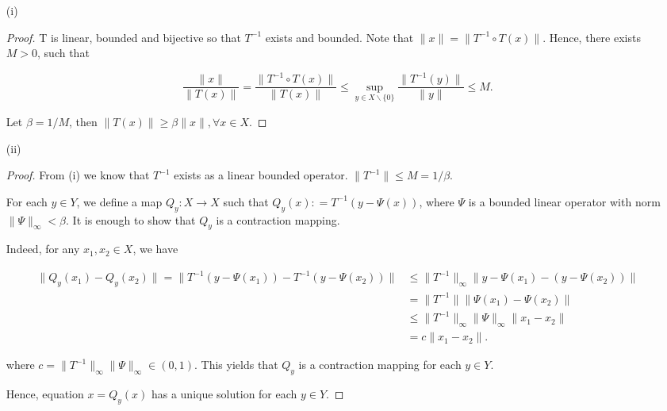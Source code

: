 \documentclass[12pt]{article}
\begin{document}
\begin{enumerate}

\item [(i)]

\begin{proof}

T is linear, bounded and bijective so that $T^{-1}$ exists and bounded. Note that $\|x\| = \|T^{-1}\circ T(x)\|$. Hence, there exists $M>0$, such that

$$
\frac{\| x \|}{\| T(x) \|} = \frac{\|T^{-1}\circ T(x)\|}{\| T(x) \|} \leqslant \sup_{y\in X\backslash \{ 0 \} } \frac{\| T^{-1} (y) \|}{\| y \|} \leqslant M.
$$

Let $\beta = 1/M$, then $\|T(x)\| \geqslant \beta \|x\|, \forall x \in X$.

\end{proof}

\item [(ii)]

\begin{proof}

From (i) we know that $T^{-1}$ exists as a linear bounded operator. $\|T^{-1}\| \leqslant M = 1/\beta$. 

For each $y\in Y$, we define a map $Q_y: X\rightarrow X$ such that $Q_y(x) : = T^{-1}(y - \Psi(x))$, where $\Psi$ is a bounded linear operator with norm $\|\Psi\|_\infty < \beta$. It is enough to show that $Q_y$ is a contraction mapping.

Indeed, for any $x_1, x_2\in X$, we have

$$
\begin{aligned}
\| Q_y(x_1) - Q_y(x_2) \| = \|T^{-1}(y - \Psi(x_1)) - T^{-1}(y - \Psi(x_2))\| & \leqslant \|T^{-1}\|_\infty \|y - \Psi(x_1) - (y - \Psi(x_2))\| \\
& = \|T^{-1}\| \|\Psi(x_1) - \Psi(x_2)\| \\
& \leqslant \|T^{-1}\|_\infty \|\Psi\|_\infty \|x_1 - x_2\| \\
& = c \|x_1 - x_2\|.
\end{aligned}
$$

where $c = \|T^{-1}\|_\infty \|\Psi\|_\infty \in (0, 1)$. This yields that $Q_y$ is a contraction mapping for each $y \in Y$.

Hence, equation $x = Q_y(x)$ has a unique solution for each $y\in Y$.

\end{proof}


\end{enumerate}
\end{document}
